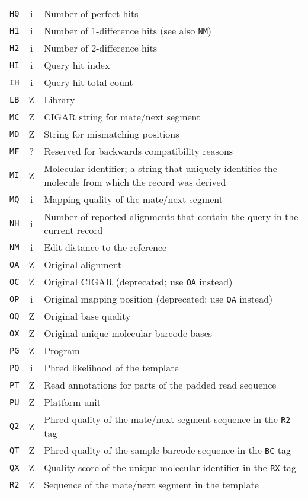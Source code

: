 \documentclass[10pt]{article}
\begin{document}
\begin{center}
\begin{longtable}{ccp{12.5cm}}
  {\tt H0} & i & Number of perfect hits \\
  {\tt H1} & i & Number of 1-difference hits (see also {\tt NM}) \\
  {\tt H2} & i & Number of 2-difference hits \\
  {\tt HI} & i & Query hit index \\
  {\tt IH} & i & Query hit total count \\
  {\tt LB} & Z & Library \\
  {\tt MC} & Z & CIGAR string for mate/next segment \\
  {\tt MD} & Z & String for mismatching positions \\
  {\tt MF} & ? & Reserved for backwards compatibility reasons \\
  {\tt MI} & Z & Molecular identifier; a string that uniquely identifies the molecule from which the record was derived \\
  {\tt MQ} & i & Mapping quality of the mate/next segment \\
  {\tt NH} & i & Number of reported alignments that contain the query in the current record \\
  {\tt NM} & i & Edit distance to the reference \\
  {\tt OA} & Z & Original alignment \\
  {\tt OC} & Z & Original CIGAR (deprecated; use {\tt OA} instead) \\
  {\tt OP} & i & Original mapping position (deprecated; use {\tt OA} instead) \\
  {\tt OQ} & Z & Original base quality \\
  {\tt OX} & Z & Original unique molecular barcode bases \\
  {\tt PG} & Z & Program \\
  {\tt PQ} & i & Phred likelihood of the template \\
  {\tt PT} & Z & Read annotations for parts of the padded read sequence \\
  {\tt PU} & Z & Platform unit \\
  {\tt Q2} & Z & Phred quality of the mate/next segment sequence in the {\tt R2} tag \\
  {\tt QT} & Z & Phred quality of the sample barcode sequence in the {\tt BC} tag \\
  {\tt QX} & Z & Quality score of the unique molecular identifier in the {\tt RX} tag \\
  {\tt R2} & Z & Sequence of the mate/next segment in the template \\

\end{longtable}
\end{center}
\end{document}
